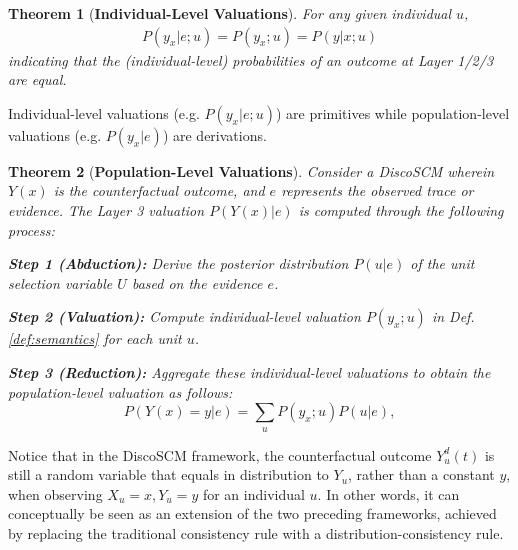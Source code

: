 \documentclass[letterpaper]{article} %
\newtheorem{theorem}{Theorem}
\theoremstyle{definition}
\theoremstyle{remark}
\begin{document}
\begin{theorem}[\textbf{Individual-Level Valuations}]
For any given individual \(u\),
\label{theo:individual}
    \begin{align*}
        P(y_x|e;u) = P(y_x;u) = P(y|x;u) 
    \end{align*}  
indicating that the (individual-level) probabilities of an outcome at Layer 1/2/3 are equal.
\end{theorem}

Individual-level valuations (e.g. $P(y_x|e;u)$) are primitives while population-level valuations  (e.g. $P(y_x|e)$) are derivations.

\begin{theorem}[\textbf{Population-Level Valuations}]
\label{algo:population}
Consider a DiscoSCM wherein $Y(x)$ is the counterfactual outcome, and \(e\) represents the observed trace or evidence. The Layer 3 valuation \(P(Y(x)|e)\) is computed through the following process:

\textbf{Step 1 (Abduction):} Derive the posterior distribution \(P(u|e)\) of the unit selection variable \(U\) based on the evidence \(e\).

\textbf{Step 2 (Valuation):} Compute individual-level valuation \(P(y_x;u)\) in Def. \ref{def:semantics} for each unit \(u\).

\textbf{Step 3 (Reduction):} Aggregate these individual-level valuations to obtain the population-level valuation as follows:
\begin{equation}
\label{eq:population}
P(Y(x)=y|e) = \sum_u P(y_x;u) P(u|e),
\end{equation}
\end{theorem}


Notice that in the DiscoSCM framework, the counterfactual outcome $Y_u^d(t)$ is still a random variable that equals in distribution to $Y_u$, rather than a constant $y$, when observing $X_u = x, Y_u = y$ for an individual $u$. In other words, it can conceptually be seen as an extension of the two preceding frameworks, achieved by replacing the traditional consistency rule with a distribution-consistency rule.
\end{document}
